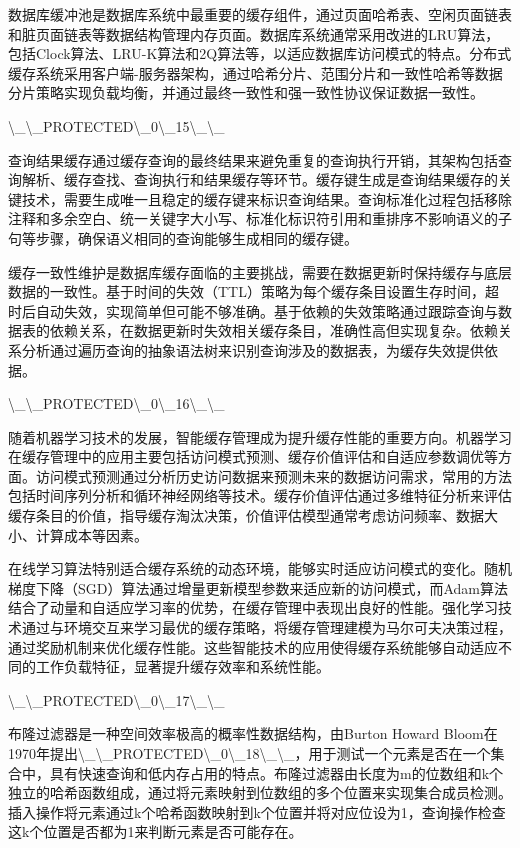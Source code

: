 数据库缓冲池是数据库系统中最重要的缓存组件，通过页面哈希表、空闲页面链表和脏页面链表等数据结构管理内存页面。数据库系统通常采用改进的LRU算法，包括Clock算法、LRU-K算法和2Q算法等，以适应数据库访问模式的特点。分布式缓存系统采用客户端-服务器架构，通过哈希分片、范围分片和一致性哈希等数据分片策略实现负载均衡，并通过最终一致性和强一致性协议保证数据一致性。

\textbackslash{}_\textbackslash{}_PROTECTED\textbackslash{}_0\textbackslash{}_15\textbackslash{}_\textbackslash{}_

查询结果缓存通过缓存查询的最终结果来避免重复的查询执行开销，其架构包括查询解析、缓存查找、查询执行和结果缓存等环节。缓存键生成是查询结果缓存的关键技术，需要生成唯一且稳定的缓存键来标识查询结果。查询标准化过程包括移除注释和多余空白、统一关键字大小写、标准化标识符引用和重排序不影响语义的子句等步骤，确保语义相同的查询能够生成相同的缓存键。

缓存一致性维护是数据库缓存面临的主要挑战，需要在数据更新时保持缓存与底层数据的一致性。基于时间的失效（TTL）策略为每个缓存条目设置生存时间，超时后自动失效，实现简单但可能不够准确。基于依赖的失效策略通过跟踪查询与数据表的依赖关系，在数据更新时失效相关缓存条目，准确性高但实现复杂。依赖关系分析通过遍历查询的抽象语法树来识别查询涉及的数据表，为缓存失效提供依据。

\textbackslash{}_\textbackslash{}_PROTECTED\textbackslash{}_0\textbackslash{}_16\textbackslash{}_\textbackslash{}_

随着机器学习技术的发展，智能缓存管理成为提升缓存性能的重要方向。机器学习在缓存管理中的应用主要包括访问模式预测、缓存价值评估和自适应参数调优等方面。访问模式预测通过分析历史访问数据来预测未来的数据访问需求，常用的方法包括时间序列分析和循环神经网络等技术。缓存价值评估通过多维特征分析来评估缓存条目的价值，指导缓存淘汰决策，价值评估模型通常考虑访问频率、数据大小、计算成本等因素。

在线学习算法特别适合缓存系统的动态环境，能够实时适应访问模式的变化。随机梯度下降（SGD）算法通过增量更新模型参数来适应新的访问模式，而Adam算法结合了动量和自适应学习率的优势，在缓存管理中表现出良好的性能。强化学习技术通过与环境交互来学习最优的缓存策略，将缓存管理建模为马尔可夫决策过程，通过奖励机制来优化缓存性能。这些智能技术的应用使得缓存系统能够自动适应不同的工作负载特征，显著提升缓存效率和系统性能。

\textbackslash{}_\textbackslash{}_PROTECTED\textbackslash{}_0\textbackslash{}_17\textbackslash{}_\textbackslash{}_

布隆过滤器是一种空间效率极高的概率性数据结构，由Burton Howard Bloom在1970年提出\textbackslash{}_\textbackslash{}_PROTECTED\textbackslash{}_0\textbackslash{}_18\textbackslash{}_\textbackslash{}_，用于测试一个元素是否在一个集合中，具有快速查询和低内存占用的特点。布隆过滤器由长度为m的位数组和k个独立的哈希函数组成，通过将元素映射到位数组的多个位置来实现集合成员检测。插入操作将元素通过k个哈希函数映射到k个位置并将对应位设为1，查询操作检查这k个位置是否都为1来判断元素是否可能存在。

